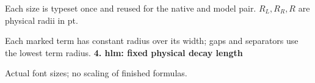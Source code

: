 \documentclass{article}
\newcommand\High{\frac{\displaystyle\sum_{k=1}^n x_k}{1+\frac pq}}
\newcommand\Medium{\frac{x^2+y^2}{z}}
\newcommand\Mark[1]{\directlua{grid.mark(#1)}}
\begin{document}
\par\medskip
Each size is typeset once and reused for the native and model pair. $R_L,R_R,R$ are physical radii in pt.\par
Each marked term has constant radius over its width; gaps and separators use the lowest term radius.
\newpage
{\Large\bfseries 4. hlm: fixed physical decay length}\par\medskip
{} Actual font sizes; no scaling of finished formulas.\par\medskip
\end{document}

